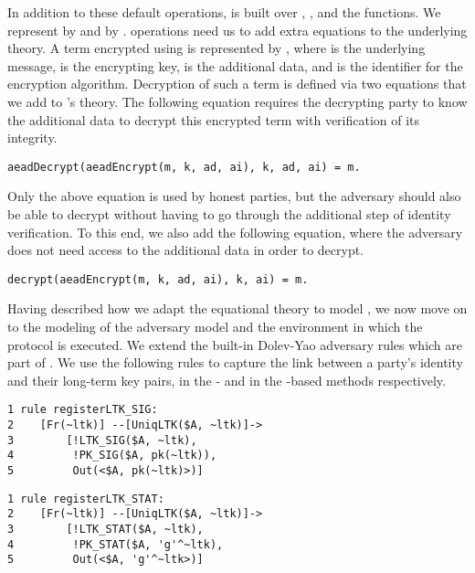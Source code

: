 In addition to these default operations, \mEdhoc{} is built over
\mHkdfExpand, \mHkdfExtract, and the \mAead{} functions.
%
We represent \mHkdfExpand{} by  and \mHkdfExtract{} by 
.
%
\mAead{} operations need us to add extra equations to the underlying theory.
%
A term encrypted using \mAead{} is represented by ,
where  is the underlying message,  is the encrypting key,
 is the additional data, and  is the identifier for the
encryption algorithm.
%
Decryption of such a term is defined via two equations that we add to
\mTamarin's theory.
%
The following equation requires the decrypting party to know the additional
data  to decrypt this encrypted term with verification of its integrity.
\begin{small}
\begin{verbatim}
aeadDecrypt(aeadEncrypt(m, k, ad, ai), k, ad, ai) = m.
\end{verbatim}
\end{small}
%
Only the above equation is used by honest parties, but the adversary should
also be able to decrypt without having to go through the additional step of
identity verification.
%
To this end, we also add the following equation, where the adversary does not
need access to the additional data  in order to decrypt.
%
\begin{small}\begin{verbatim}
decrypt(aeadEncrypt(m, k, ad, ai), k, ai) = m.
\end{verbatim}\end{small}
%

Having described how we adapt the equational theory to model \mEdhoc,
we now move on to the modeling of the adversary model and the 
environment in
which the protocol is executed.
%
We extend the built-in Dolev-Yao adversary rules which are part of 
\mTamarin.
%
We use the following rules to capture the link between a party's identity and
their long-term key pairs, in the \mSig{}- and in the \mStat{}-based methods
respectively.
\begin{center}
\begin{minipage}{0.48\textwidth}
\begin{scriptsize}
\begin{verbatim}
1 rule registerLTK_SIG:
2    [Fr(~ltk)] --[UniqLTK($A, ~ltk)]->
3        [!LTK_SIG($A, ~ltk),
4         !PK_SIG($A, pk(~ltk)),
5         Out(<$A, pk(~ltk)>)]
\end{verbatim}
\end{scriptsize}
\end{minipage}
\hfill\vline\hfill
\begin{minipage}{0.48\textwidth}
\begin{scriptsize}
\begin{verbatim}
1 rule registerLTK_STAT:
2    [Fr(~ltk)] --[UniqLTK($A, ~ltk)]->
3        [!LTK_STAT($A, ~ltk),
4         !PK_STAT($A, 'g'^~ltk),
5         Out(<$A, 'g'^~ltk>)]
\end{verbatim}
\end{scriptsize}
\end{minipage}
\end{center}

